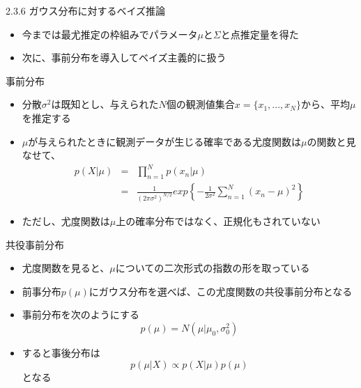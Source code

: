 \begin{frame}{2.3.6 ガウス分布に対するベイズ推論}
 \begin{itemize}
  \item 今までは最尤推定の枠組みでパラメータ$\mu$と$\Sigma$と点推定量を得た
  \item 次に、事前分布を導入してベイズ主義的に扱う
 \end{itemize}
\end{frame}

\begin{frame}{事前分布}
 \begin{itemize}
  \item \alert{分散$\sigma^2$は既知}とし、与えられた$N$個の観測値集合$x=\{x_1,...,x_N\}$から、平均$\mu$を推定する
  \item $\mu$が与えられたときに観測データが生じる確率である尤度関数は$\mu$の関数と見なせて、
        \begin{eqnarray*}
         p(X|\mu) &= &\prod_{n=1}^{N}p(x_n|\mu) \\
         &=& \frac{1}{(2\pi\sigma^2)^{N/2}}exp\left\{-\frac{1}{2\sigma^2}\sum_{n=1}^{N}(x_n-\mu)^2\right\}
        \end{eqnarray*}
  \item ただし、尤度関数は$\mu$上の確率分布ではなく、正規化もされていない
 \end{itemize}
\end{frame}

\begin{frame}{共役事前分布}
 \begin{itemize}
  \item 尤度関数を見ると、$\mu$についての二次形式の指数の形を取っている
  \item 前事分布$p(\mu)$にガウス分布を選べば、この尤度関数の共役事前分布となる
  \item 事前分布を次のようにする
        \begin{equation}
         p(\mu) = N(\mu|\mu_0,\sigma_0^2)
        \end{equation}
  \item すると事後分布は
        \begin{equation}
         p(\mu|X) \propto p(X|\mu)p(\mu)
        \end{equation}
        となる
 \end{itemize}
\end{frame}

